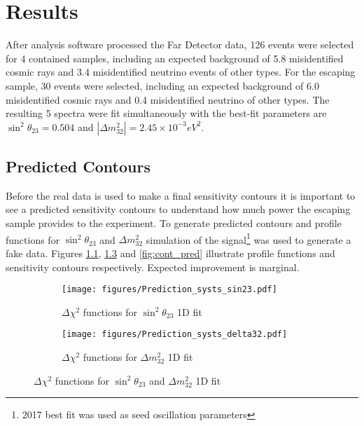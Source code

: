 \chapter{Results}
\label{results_chapter}

After analysis software processed the Far Detector data, 126 events were selected for 4 contained 
samples, including an expected background of 5.8 misidentified cosmic rays and 3.4 misidentified 
neutrino events of other types. For the escaping sample, 30 events were selected, including an expected
background of 6.0 misidentified cosmic rays and 0.4 misidentified neutrino of other types. The resulting
5 spectra were fit simultaneously with the best-fit parameters are $\sin^2\theta_{23} = 0.504$ and 
$|\Delta m^2_{32}| = 2.45\times 10^{-3} eV^2$.

\section{Predicted Contours}
Before the real data is used to make a final sensitivity contours it is important to see a predicted 
sensitivity contours to understand how much power the escaping sample provides to the experiment. 
To generate predicted contours and profile functions for $\sin^2\theta_{23}$ and $\Delta m^2_{32}$ simulation
of the signal\footnote{2017 best fit was used as seed oscillation parameters} was used to generate a fake data.
Figures \ref{fig:profile_pred_sin}, \ref{fig:profile_pred_delta} and \ref{fig:cont_pred} illustrate profile 
functions and sensitivity contours respectively. Expected improvement is marginal.

\begin{figure}[!th]
\centering
\begin{subfigure}[t]{0.95\textwidth}
  \centering
  \texttt{[image: figures/Prediction\_systs\_sin23.pdf]}
  \caption{ $\Delta\chi^2$ functions for $\sin^2\theta_{23}$ 1D fit}
  \label{fig:profile_pred_sin}
\end{subfigure}
\vspace{0.5cm}
\newline
\begin{subfigure}[t]{0.95\textwidth}
  \centering
  \texttt{[image: figures/Prediction\_systs\_delta32.pdf]}
  \caption{$\Delta\chi^2$ functions for $\Delta m^2_{32}$ 1D fit}
  \label{fig:profile_pred_delta}
\end{subfigure}
\caption{ $\Delta\chi^2$ functions for $\sin^2\theta_{23}$ and $\Delta m^2_{32}$ 1D fit }
{}
\end{figure}

